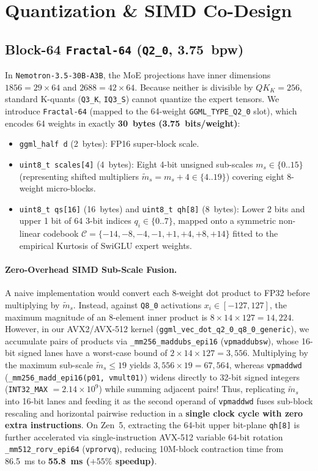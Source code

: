 \documentclass[10pt,twocolumn]{article}
\begin{document}
\section{Quantization \& SIMD Co-Design}
\label{sec:quant}

\subsection{Block-64 \texttt{Fractal-64} (\texttt{Q2\_0}, 3.75~bpw)}
In \texttt{Nemotron-3.5-30B-A3B}, the MoE projections have inner dimensions $1856 = 29 \times 64$ and $2688 = 42 \times 64$. Because neither is divisible by $QK_K = 256$, standard K-quants (\texttt{Q3\_K}, \texttt{IQ3\_S}) cannot quantize the expert tensors. We introduce \texttt{Fractal-64} (mapped to the 64-weight \texttt{GGML\_TYPE\_Q2\_0} slot), which encodes 64 weights in exactly \textbf{30~bytes (3.75~bits/weight)}:
\begin{itemize}
    \item \texttt{ggml\_half d} (2~bytes): FP16 super-block scale.
    \item \texttt{uint8\_t scales[4]} (4~bytes): Eight 4-bit unsigned sub-scales $m_s \in \{0..15\}$ (representing shifted multipliers $\tilde{m}_s = m_s + 4 \in \{4..19\}$) covering eight 8-weight micro-blocks.
    \item \texttt{uint8\_t qs[16]} (16~bytes) and \texttt{uint8\_t qh[8]} (8~bytes): Lower 2 bits and upper 1 bit of 64 3-bit indices $q_i \in \{0..7\}$, mapped onto a symmetric non-linear codebook $\mathcal{C} = \{-14, -8, -4, -1, +1, +4, +8, +14\}$ fitted to the empirical Kurtosis of SwiGLU expert weights.
\end{itemize}

\paragraph{Zero-Overhead SIMD Sub-Scale Fusion.}
A naive implementation would convert each 8-weight dot product to FP32 before multiplying by $\tilde{m}_s$. Instead, against \texttt{Q8\_0} activations $x_i \in [-127, 127]$, the maximum magnitude of an 8-element inner product is $8 \times 14 \times 127 = 14,224$. However, in our AVX2/AVX-512 kernel (\texttt{ggml\_vec\_dot\_q2\_0\_q8\_0\_generic}), we accumulate pairs of products via \texttt{\_mm256\_maddubs\_epi16} (\texttt{vpmaddubsw}), whose 16-bit signed lanes have a worst-case bound of $2 \times 14 \times 127 = 3,556$. Multiplying by the maximum sub-scale $\tilde{m}_s \le 19$ yields $3,556 \times 19 = 67,564$, whereas \texttt{vpmaddwd} (\texttt{\_mm256\_madd\_epi16(p01, vmult01)}) widens directly to 32-bit signed integers (\texttt{INT32\_MAX} $= 2.14 \times 10^9$) while summing adjacent pairs! Thus, replicating $\tilde{m}_s$ into 16-bit lanes and feeding it as the second operand of \texttt{vpmaddwd} fuses sub-block rescaling and horizontal pairwise reduction in a \textbf{single clock cycle with zero extra instructions}. On Zen~5, extracting the 64-bit upper bit-plane \texttt{qh[8]} is further accelerated via single-instruction AVX-512 variable 64-bit rotation \texttt{\_mm512\_rorv\_epi64} (\texttt{vprorvq}), reducing 10M-block contraction time from 86.5~ms to \textbf{55.8~ms ($+55\%$ speedup)}.
\end{document}

